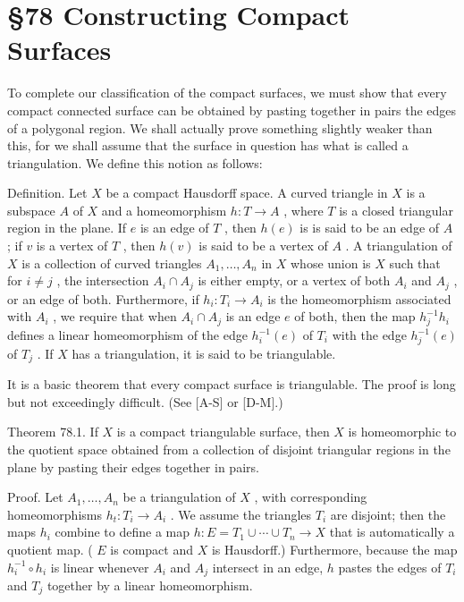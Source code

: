 \documentclass[10pt]{article}
\begin{document}
\section*{§78 Constructing Compact Surfaces}

To complete our classification of the compact surfaces, we must show that every compact connected surface can be obtained by pasting together in pairs the edges of a polygonal region. We shall actually prove something slightly weaker than this, for we shall assume that the surface in question has what is called a triangulation. We define this notion as follows:

Definition. Let \(X\) be a compact Hausdorff space. A curved triangle in \(X\) is a subspace \(A\) of \(X\) and a homeomorphism \(h : T \rightarrow  A\) , where \(T\) is a closed triangular region in the plane. If \(e\) is an edge of \(T\) , then \(h\left( e\right)\) is is said to be an edge of \(A\) ; if \(v\) is a vertex of \(T\) , then \(h\left( v\right)\) is said to be a vertex of \(A\) . A triangulation of \(X\) is a collection of curved triangles \({A}_{1},\ldots ,{A}_{n}\) in \(X\) whose union is \(X\) such that for \(i \neq  j\) , the intersection \({A}_{i} \cap  {A}_{j}\) is either empty, or a vertex of both \({A}_{i}\) and \({A}_{j}\) , or an edge of both. Furthermore, if \({h}_{i} : {T}_{i} \rightarrow  {A}_{i}\) is the homeomorphism associated with \({A}_{i}\) , we require that when \({A}_{i} \cap  {A}_{j}\) is an edge \(e\) of both, then the map \({h}_{j}^{-1}{h}_{i}\) defines a linear homeomorphism of the edge \({h}_{i}^{-1}\left( e\right)\) of \({T}_{i}\) with the edge \({h}_{j}^{-1}\left( e\right)\) of \({T}_{j}\) . If \(X\) has a triangulation, it is said to be triangulable.

It is a basic theorem that every compact surface is triangulable. The proof is long but not exceedingly difficult. (See [A-S] or [D-M].)

Theorem 78.1. If \(X\) is a compact triangulable surface, then \(X\) is homeomorphic to the quotient space obtained from a collection of disjoint triangular regions in the plane by pasting their edges together in pairs.

Proof. Let \({A}_{1},\ldots ,{A}_{n}\) be a triangulation of \(X\) , with corresponding homeomorphisms \({h}_{t} : {T}_{i} \rightarrow  {A}_{i}\) . We assume the triangles \({T}_{i}\) are disjoint; then the maps \({h}_{i}\) combine to define a map \(h : E = {T}_{1} \cup  \cdots  \cup  {T}_{n} \rightarrow  X\) that is automatically a quotient map. ( \(E\) is compact and \(X\) is Hausdorff.) Furthermore, because the map \({h}_{i}^{-1} \circ  {h}_{i}\) is linear whenever \({A}_{i}\) and \({A}_{j}\) intersect in an edge, \(h\) pastes the edges of \({T}_{i}\) and \({T}_{j}\) together by a linear homeomorphism.
\end{document}
